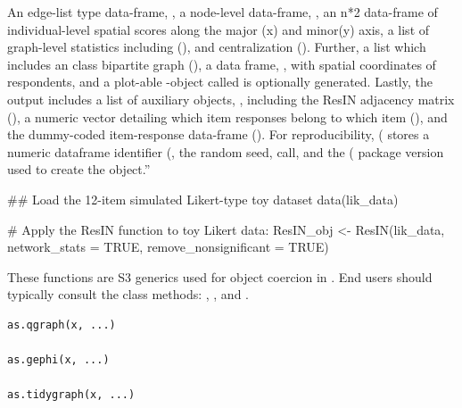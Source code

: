 \documentclass[a4paper]{book}
\begin{document}
\begin{Value}
An edge-list type data-frame, , a node-level data-frame, , an n*2 data-frame of individual-level spatial scores along the major (x) and minor(y) axis,  a list of graph-level statistics  including (), and centralization (). Further, a  list which includes an  class bipartite graph (), a data frame, , with spatial coordinates of respondents, and a plot-able -object called  is optionally generated. Lastly, the output includes a list of auxiliary objects, , including the ResIN adjacency matrix (), a numeric vector detailing which item responses belong to which item (), and the dummy-coded item-response data-frame (). For reproducibility, ( stores a numeric dataframe identifier (, the random seed, call, and the ( package version used to create the object.”
\end{Value}
%
\begin{Examples}
\begin{ExampleCode}

## Load the 12-item simulated Likert-type toy dataset
data(lik_data)

# Apply the ResIN function to toy Likert data:
ResIN_obj <- ResIN(lik_data, network_stats = TRUE, remove_nonsignificant = TRUE)

\end{ExampleCode}
\end{Examples}
%
\begin{Description}
These functions are S3 generics used for object coercion in .
End users should typically consult the class methods:
, , and .
\end{Description}
%
\begin{Usage}
\begin{verbatim}
as.qgraph(x, ...)

as.gephi(x, ...)

as.tidygraph(x, ...)
\end{verbatim}
\end{Usage}
\end{document}
